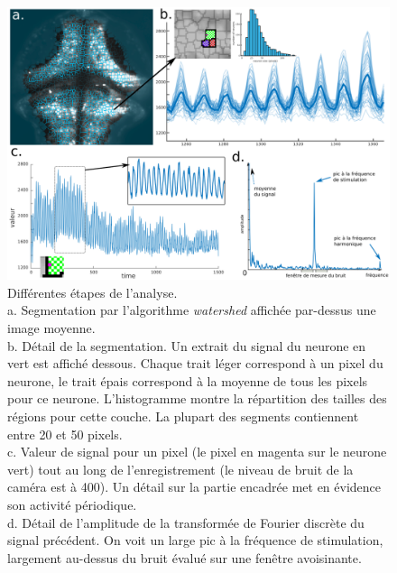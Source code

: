 \begin{figure}
\centering
\includegraphics[width=1\textwidth]{./files/analysis_illustration.svg.png}
\caption{Différentes étapes de l'analyse.
\\a. Segmentation par l'algorithme \emph{watershed} affichée par-dessus une image moyenne.
\\b. Détail de la segmentation. Un extrait du signal du neurone en vert est affiché dessous. Chaque trait léger correspond à un pixel du neurone, le trait épais correspond à la moyenne de tous les pixels pour ce neurone. L'histogramme montre la répartition des tailles des régions pour cette couche. La plupart des segments contiennent entre 20 et 50 pixels.
\\c. Valeur de signal pour un pixel (le pixel en magenta sur le neurone vert) tout au long de l'enregistrement (le niveau de bruit de la caméra est à 400). Un détail sur la partie encadrée met en évidence son activité périodique.
\\d. Détail de l'amplitude de la transformée de Fourier discrète du signal précédent. On voit un large pic à la fréquence de stimulation, largement au-dessus du bruit évalué sur une fenêtre avoisinante.
\label{FIGfourier}}
\end{figure}    


